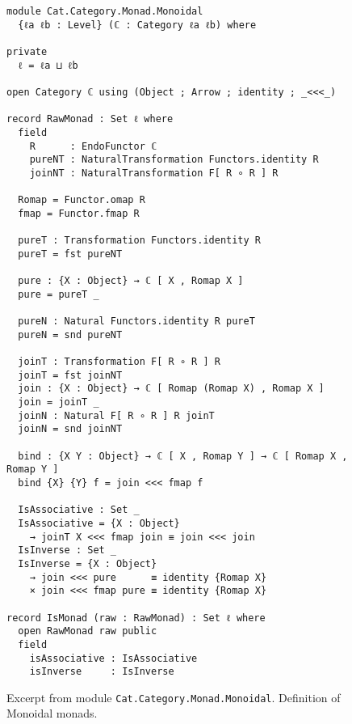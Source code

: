 \begin{figure}[h]
\begin{Verbatim}
module Cat.Category.Monad.Monoidal
  {ℓa ℓb : Level} (ℂ : Category ℓa ℓb) where

private
  ℓ = ℓa ⊔ ℓb

open Category ℂ using (Object ; Arrow ; identity ; _<<<_)

record RawMonad : Set ℓ where
  field
    R      : EndoFunctor ℂ
    pureNT : NaturalTransformation Functors.identity R
    joinNT : NaturalTransformation F[ R ∘ R ] R

  Romap = Functor.omap R
  fmap = Functor.fmap R

  pureT : Transformation Functors.identity R
  pureT = fst pureNT

  pure : {X : Object} → ℂ [ X , Romap X ]
  pure = pureT _

  pureN : Natural Functors.identity R pureT
  pureN = snd pureNT

  joinT : Transformation F[ R ∘ R ] R
  joinT = fst joinNT
  join : {X : Object} → ℂ [ Romap (Romap X) , Romap X ]
  join = joinT _
  joinN : Natural F[ R ∘ R ] R joinT
  joinN = snd joinNT

  bind : {X Y : Object} → ℂ [ X , Romap Y ] → ℂ [ Romap X , Romap Y ]
  bind {X} {Y} f = join <<< fmap f

  IsAssociative : Set _
  IsAssociative = {X : Object}
    → joinT X <<< fmap join ≡ join <<< join
  IsInverse : Set _
  IsInverse = {X : Object}
    → join <<< pure      ≡ identity {Romap X}
    × join <<< fmap pure ≡ identity {Romap X}

record IsMonad (raw : RawMonad) : Set ℓ where
  open RawMonad raw public
  field
    isAssociative : IsAssociative
    isInverse     : IsInverse
\end{Verbatim}
\caption{Excerpt from module \texttt{Cat.Category.Monad.Monoidal}. Definition of
  Monoidal monads.}
\end{figure}
